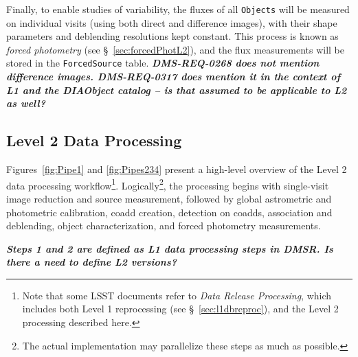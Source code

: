 \documentclass[12pt]{article}
\newcommand{\code}[1]{\texttt{#1}}
\newcommand{\annotate}[1]{{\color{magenta}\large\textbf{\emph{#1}}}}
\newcommand{\Objects}{\code{Objects}\xspace}
\newcommand{\ForcedSource}{\code{ForcedSource}\xspace}
\newcommand{\req}[1]{\marginpar{\tiny #1}}
\newcommand{\dmreq}[1]{\req{DMS-REQ-#1}}
\begin{document}
Finally, to enable studies of variability, the fluxes of all \Objects will be measured on individual visits (using both
direct and difference images), with their shape parameters and deblending resolutions kept constant. This process is known as {\em forced photometry} (see \S~\ref{sec:forcedPhotL2}), and the flux measurements will be stored in the \ForcedSource table.\dmreq{0268}
\annotate{DMS-REQ-0268 does not mention difference images. DMS-REQ-0317 does mention it in the context of L1 and the DIAObject catalog -- is that assumed to be applicable to L2 as well?}

\subsection{Level 2 Data Processing}
\label{sec:level2dp}


Figures~\ref{fig:Pipe1} and \ref{fig:Pipes234}
present a high-level overview of the Level 2 data processing workflow\footnote{Note that some LSST documents refer to {\em Data Release Processing}, which includes both Level 1 reprocessing (see \S~\ref{sec:l1dbreproc}), and the Level 2 processing described here.}. Logically\footnote{The actual implementation may parallelize these steps as much as possible.}, the processing begins with single-visit image reduction and source measurement, followed by global astrometric and photometric calibration, coadd creation, detection on coadds, association and deblending, object characterization, and forced photometry measurements.

\annotate{Steps 1 and 2 are defined as L1 data processing steps in DMSR. Is there a need to define L2 versions?}
\end{document}
